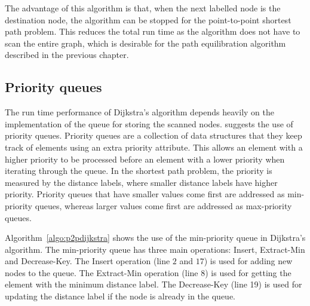 The advantage of this algorithm is that,
when the next labelled node is the destination node,
the algorithm can be stopped for the point-to-point shortest path problem.
This reduces the total run time as the algorithm does not have to scan the entire graph,
which is desirable for the path equilibration algorithm described in the previous chapter.

\subsection{Priority queues} \label{sec:pq}
The run time performance of Dijkstra's algorithm depends heavily on the implementation of the queue for storing the scanned nodes.
\citet{Cormen} suggests the use of priority queues.
Priority queues are a collection of data structures
that they keep track of elements using an extra priority attribute.
This allows an element with a higher priority to be processed before an element with a lower priority when iterating through the queue.
In the shortest path problem, the priority is measured by the distance labels, where smaller distance labels have higher priority.
Priority queues that have smaller values come first are addressed as min-priority queues, whereas larger values come first are addressed as max-priority queues.

Algorithm~\ref{algo:p2pdijkstra} shows the use of the min-priority queue in Dijkstra's algorithm.
The min-priority queue has three main operations: Insert, Extract-Min and Decrease-Key.
The Insert operation (line $2$ and $17$) is used for adding new nodes to the queue.
The Extract-Min operation (line 8) is used for getting the element with the minimum distance label.
The Decrease-Key (line 19) is used for updating the distance label if the node is already in the queue.

